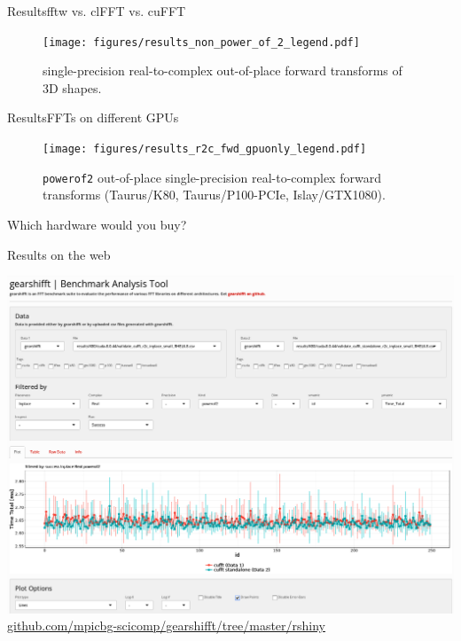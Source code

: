 \documentclass[t,11pt,hyperref={
  pdftitle = {gearshifft},
  pdfsubject = {gearshifft},
  pdfborder={0 0 0},
  colorlinks=true,
  urlcolor=red,
  citecolor=red,
  linkcolor=red,
  pdfauthor={Peter Steinbach, Matthias Werner}
  }
]{beamer}
\begin{document}
\begin{frame}{Results}{fftw vs. clFFT vs. cuFFT}
\begin{figure}[!tbp]
  \centering
  \texttt{[image: figures/results\_non\_power\_of\_2\_legend.pdf]}\\[-1em]
  \hfill
  \caption{single-precision real-to-complex out-of-place forward transforms of 3D shapes.}
  \label{fig:non_power_of_2}
\end{figure}
\end{frame}

\begin{frame}{Results}{FFTs on different GPUs}
\vfill
\begin{figure}[!tbp]
  \centering
  \texttt{[image: figures/results\_r2c\_fwd\_gpuonly\_legend.pdf]}\vspace{-1em}
  \hfill
  \caption{\texttt{powerof2} out-of-place single-precision real-to-complex forward transforms (Taurus/K80, Taurus/P100-PCIe, Islay/GTX1080).}
  \label{fig:power_of_2}
\end{figure}
\vfill
\begin{center}
  \large
  Which hardware would you buy?
\end{center}
\vfill
\end{frame}


\begin{frame}{Results on the web}
  \begin{center}
    \includegraphics[width=.8\textwidth]{rshiny.png}\\[20pt]
    \href{https://github.com/mpicbg-scicomp/gearshifft/tree/master/rshiny}{github.com/mpicbg-scicomp/gearshifft/tree/master/rshiny}
  \end{center}

\end{frame}
\end{document}
